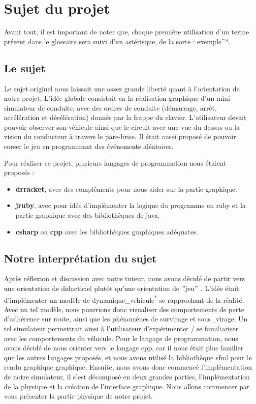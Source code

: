 \section{Sujet du projet}\label{sec:sujet-du-projet}
Avant tout, il est important de noter que, chaque première utilisation d'un terme présent dans le glossaire sera suivi d'un astérisque, de la sorte : exemple^{*}.
\subsection{Le sujet}\label{subsec:le-sujet}
Le sujet originel nous laissait une assez grande liberté quant à l'orientation de notre projet.
L'idée globale consistait en la réalisation graphique d'un mini-simulateur de conduite, avec des ordres de conduite (démarrage, arrêt, accélération et décélération) donnés par la frappe du clavier.
L'utilisateur devait pouvoir observer son véhicule ainsi que le circuit avec une vue du dessus ou la vision du conducteur à travers le pare-brise.
Il était aussi proposé de pouvoir \og corser\fg{} le jeu en programmant des événements aléatoires.

Pour réaliser ce projet, plusieurs langages de programmation nous étaient proposés :
\begin{itemize}
    \item \textbf{\gls{drracket}}, avec des compléments pour nous aider sur la partie graphique.
    \item \textbf{\gls{jruby}}, avec pour idée d'implémenter la logique du programme en \gls{ruby} et la partie graphique avec des bibliothèques de \gls{java}.
    \item \textbf{\gls{csharp}} ou \textbf{\gls{cpp}} avec les bibliothèques graphiques adéquates.
\end{itemize}


\subsection{Notre interprétation du sujet}\label{subsec:notre-interpretation-du-sujet-/-objectif-du-sujet}
Après réflexion et discussion avec notre tuteur, nous avons décidé de partir vers une orientation de didacticiel plutôt qu'une \og orientation de \("\)jeu\("\) \fg{}.
L'idée était d'implémenter un modèle de \gls{dynamique_vehicule}\textsuperscript{*} se rapprochant de la réalité.
Avec un tel modèle, nous pourrions donc visualiser des comportements de perte d'adhérence sur route, ainsi que les phénomènes de \gls{survirage} et \gls{sous_virage}.
Un tel simulateur permettrait ainsi à l'utilisateur d'expérimenter / se familiariser avec les comportements du véhicule.
Pour le langage de programmation, nous avons décidé de nous orienter vers le langage \gls{cpp}, car il nous était plus familier que les autres langages proposés, et nous avons utilisé la bibliothèque \og \gls{sfml} \fg{} pour le rendu graphique graphique.
Ensuite, nous avons donc commencé l'implémentation de notre simulateur, il s'est décomposé en deux grandes parties, l'implémentation de la physique et la création de l'interface graphique.
Nous allons commencer par vous présenter la partie physique de notre projet.

\newpage